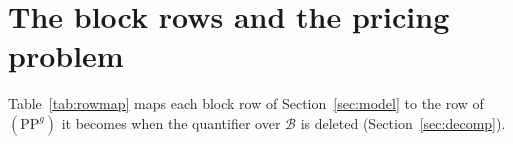 \section{The block rows and the pricing problem}
\label{appendix:rowmap}

Table~\ref{tab:rowmap} maps each block row of Section~\ref{sec:model}
to the row of $(\mathrm{PP}^{g})$ it becomes when the quantifier over
$\mathcal{B}$ is deleted (Section~\ref{sec:decomp}).


